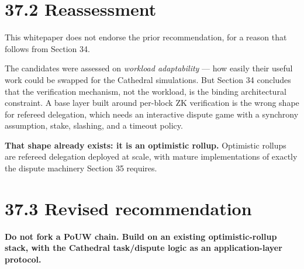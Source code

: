 \documentclass[
  11pt]{report}
\begin{document}
\hypertarget{reassessment}{%
\section{37.2 Reassessment}\label{reassessment}}

This whitepaper does not endorse the prior recommendation, for a reason
that follows from Section 34.

The candidates were assessed on \emph{workload adaptability} --- how
easily their useful work could be swapped for the Cathedral simulations.
But Section 34 concludes that the verification mechanism, not the
workload, is the binding architectural constraint. A base layer built
around per-block ZK verification is the wrong shape for refereed
delegation, which needs an interactive dispute game with a synchrony
assumption, stake, slashing, and a timeout policy.

\textbf{That shape already exists: it is an optimistic rollup.}
Optimistic rollups are refereed delegation deployed at scale, with
mature implementations of exactly the dispute machinery Section 35
requires.

\hypertarget{revised-recommendation}{%
\section{37.3 Revised recommendation}\label{revised-recommendation}}

\textbf{Do not fork a PoUW chain. Build on an existing optimistic-rollup
stack, with the Cathedral task/dispute logic as an application-layer
protocol.}
\end{document}
